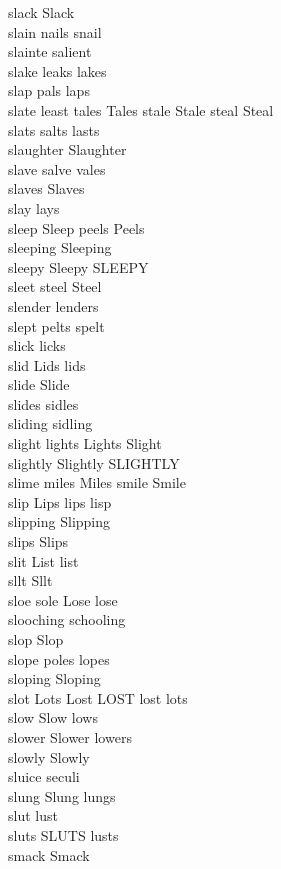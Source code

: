slack Slack\\
slain nails snail\\
slainte salient\\
slake leaks lakes\\
slap pals laps\\
slate least tales Tales stale Stale steal Steal\\
slats salts lasts\\
slaughter Slaughter\\
slave salve vales\\
slaves Slaves\\
slay lays\\
sleep Sleep peels Peels\\
sleeping Sleeping\\
sleepy Sleepy SLEEPY\\
sleet steel Steel\\
slender lenders\\
slept pelts spelt\\
slick licks\\
slid Lids lids\\
slide Slide\\
slides sidles\\
sliding sidling\\
slight lights Lights Slight\\
slightly Slightly SLIGHTLY\\
slime miles Miles smile Smile\\
slip Lips lips lisp\\
slipping Slipping\\
slips Slips\\
slit List list\\
sllt Sllt\\
sloe sole Lose lose\\
slooching schooling\\
slop Slop\\
slope poles lopes\\
sloping Sloping\\
slot Lots Lost LOST lost lots\\
slow Slow lows\\
slower Slower lowers\\
slowly Slowly\\
sluice seculi\\
slung Slung lungs\\
slut lust\\
sluts SLUTS lusts\\
smack Smack\\
